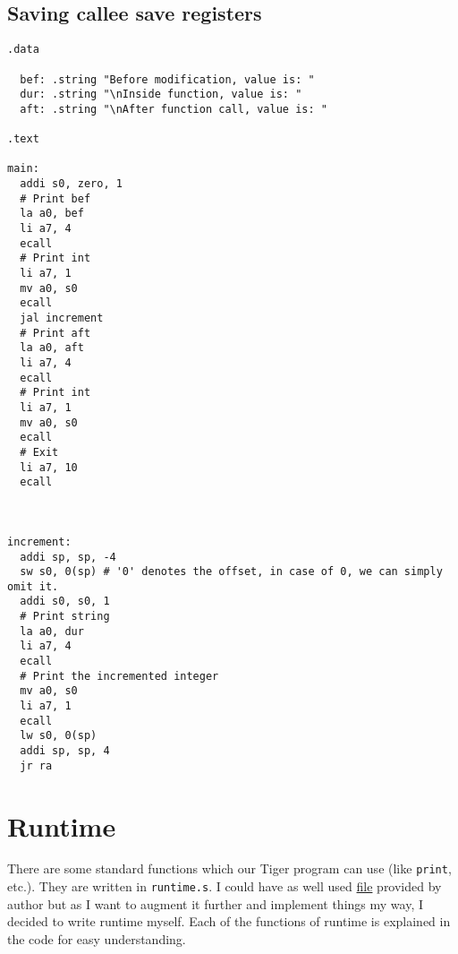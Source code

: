 \subsection{Saving callee save registers}
\begin{verbatim}
.data

  bef: .string "Before modification, value is: "
  dur: .string "\nInside function, value is: "
  aft: .string "\nAfter function call, value is: "

.text 

main:
  addi s0, zero, 1
  # Print bef
  la a0, bef
  li a7, 4
  ecall
  # Print int
  li a7, 1
  mv a0, s0
  ecall
  jal increment
  # Print aft
  la a0, aft
  li a7, 4
  ecall
  # Print int
  li a7, 1
  mv a0, s0
  ecall
  # Exit
  li a7, 10
  ecall



increment:
  addi sp, sp, -4
  sw s0, 0(sp) # '0' denotes the offset, in case of 0, we can simply omit it.
  addi s0, s0, 1
  # Print string
  la a0, dur
  li a7, 4
  ecall
  # Print the incremented integer
  mv a0, s0
  li a7, 1
  ecall
  lw s0, 0(sp)
  addi sp, sp, 4
  jr ra
\end{verbatim}

\section{Runtime}


There are some standard functions which our Tiger program can use (like \texttt{print}, etc.). They are written in \texttt{runtime.s}. I could have as well used \href{https://www.cs.princeton.edu/~appel/modern/spim/runtime.s}{file} provided by author but as I want to augment it further and implement things my way, I decided to write runtime myself. Each of the functions of runtime is explained in the code for easy understanding. 
